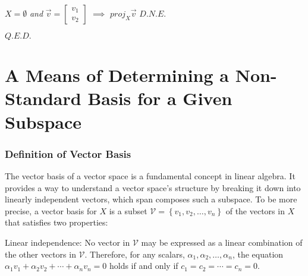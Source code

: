 \documentclass{article}
\newcommand{\vectorproj}[2][]{\textit{proj}_{{#1}}{#2}}
\begin{document}
{\begin{center}
	
\end{center}

\begin{center}
$X = \emptyset
$
\textit{and}
$\vec{v} = \begin{bmatrix}
	v_1 \\
	v_2
\end{bmatrix}
$
$\implies$
$\vectorproj[X]{\vec{v}}$ $D.N.E.$

$Q.E.D.$
\end{center}

\section{A Means of Determining a Non-Standard Basis for a Given Subspace}


\begin{center}
	\subsubsection{Definition of Vector Basis}
	{The vector basis of a vector space is a fundamental concept in linear algebra. It provides a way to understand a vector space's structure by breaking it down into linearly independent vectors, which span composes such a subspace. To be more precise, a vector basis for $X$ is a subset $\mathcal{V}=\left\{{v_1,v_2,\ldots,v_n}\right\}$ of the vectors in $X$ that satisfies two properties:
		
		
		Linear independence: No vector in $\mathcal{V}$ may be expressed as a linear combination of the other vectors in $\mathcal{V}$. Therefore, for any scalars, $\alpha_1,\alpha_2,\ldots,\alpha_n$, the equation $\alpha_1v_1+\alpha_2v_2+\cdots+\alpha_nv_n=0$ holds if and only if $c_1=c_2=\cdots=c_n=0$.
		
}
\end{center}}
\end{document}
